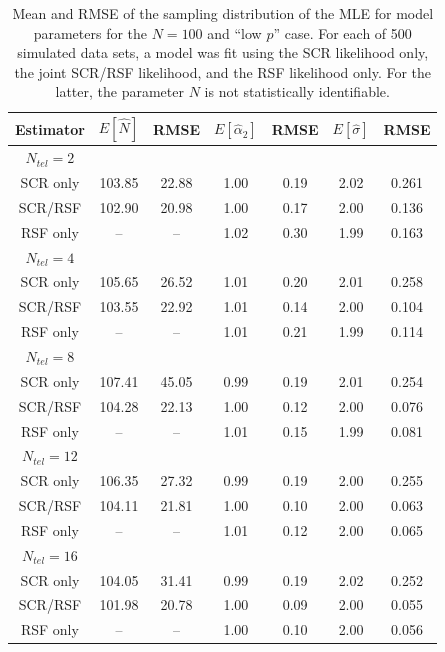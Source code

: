 \documentclass[12pt]{article}
\begin{document}
\begin{table}
\centering
\caption{Mean and RMSE of the sampling distribution of the MLE for
  model parameters for the $N=100$ and ``low $p$'' case. For each of
  500 simulated data sets, a model was fit using the SCR likelihood
  only, the joint SCR/RSF likelihood, and the RSF likelihood only. For
  the latter, the parameter $N$ is not statistically identifiable. }
\begin{tabular}{ccccccc}
\hline \hline
Estimator & $E[\hat{N}]$ & RMSE & $E[\hat{\alpha}_{2}]$ & RMSE &
$E[\hat{\sigma}]$ & RMSE \\
 \hline
$N_{tel} = 2$ &      &      &       &      &    &      \\
SCR only     &103.85& 22.88&   1.00& 0.19& 2.02& 0.261 \\
SCR/RSF      &102.90& 20.98&   1.00& 0.17& 2.00& 0.136\\
RSF only     &--    & --   &  1.02 & 0.30& 1.99& 0.163\\
$N_{tel}=4$   &      &      &       &     &     &        \\
SCR only     &105.65& 26.52&   1.01& 0.20& 2.01& 0.258 \\
SCR/RSF      &103.55& 22.92&   1.01& 0.14& 2.00& 0.104\\
RSF only     & --   & --   &  1.01 & 0.21& 1.99& 0.114\\
$N_{tel}=8$   &      &      &       &     &     &       \\
SCR only     &107.41&  45.05&   0.99& 0.19& 2.01& 0.254 \\
SCR/RSF      &104.28&  22.13&   1.00& 0.12& 2.00& 0.076\\
RSF only     &--    & --    &  1.01& 0.15& 1.99& 0.081\\
$N_{tel}=12$  &      &       &      &     &      &      \\
SCR only     &106.35&  27.32& 0.99& 0.19 & 2.00& 0.255\\
SCR/RSF      &104.11&  21.81& 1.00& 0.10 & 2.00& 0.063\\
RSF only     & --   &  --   & 1.01& 0.12 & 2.00& 0.065\\
$N_{tel}=16$  &      &       &     &      &     &       \\
SCR only     &104.05&  31.41& 0.99& 0.19 & 2.02& 0.252\\
SCR/RSF      &101.98&  20.78& 1.00& 0.09 & 2.00& 0.055\\
RSF only     & --   &  --   & 1.00& 0.10 & 2.00& 0.056\\
\end{tabular}
\label{tab.lowp}
\end{table}
\end{document}
